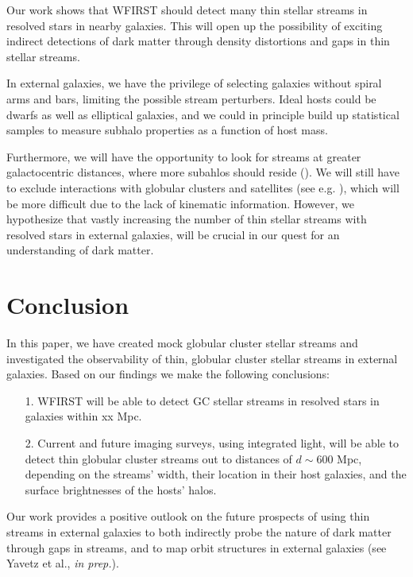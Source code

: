 \documentclass[twocolumn]{aastex62}
\begin{document}
Our work shows that WFIRST should detect many thin stellar streams in resolved stars in nearby galaxies. This will open up the possibility of exciting indirect detections of dark matter through density distortions and gaps in thin stellar streams. 

In external galaxies, we have the privilege of selecting galaxies without spiral arms and bars, limiting the possible stream perturbers. Ideal hosts could be dwarfs as well as elliptical galaxies, and we could in principle build up statistical samples to measure subhalo properties as a function of host mass. 

Furthermore, we will  have the opportunity to look for streams at greater galactocentric distances, where more subahlos should reside (\citealt{garrison17}). We will still have to exclude interactions with globular clusters and satellites (see e.g. \citealt{bonaca19}), which will be more difficult due to the lack of kinematic information. However, we hypothesize that vastly increasing the number of thin stellar streams with resolved stars in external galaxies, will be crucial in our quest for an understanding of dark matter. 

\section{Conclusion}\label{sec:conclusion}
In this paper, we have created mock globular cluster stellar streams and investigated the observability of thin, globular cluster stellar streams in external galaxies. Based on our findings we make the following conclusions:

\begin{itemize}
\item[1.]  WFIRST will be able to detect GC stellar streams in resolved stars in galaxies within xx Mpc.
\item[2.]  Current and future imaging surveys, using integrated light, will be able to detect thin globular cluster streams out to distances of $d \sim 600$ Mpc, depending on the streams' width, their location in their host galaxies, and the surface brightnesses of the hosts' halos. 
\end{itemize}


Our work provides a positive outlook on the future prospects of using thin streams in external galaxies to both indirectly probe the nature of dark matter through gaps in streams, and to map orbit structures in external galaxies (see Yavetz et al., {\it in prep.}). 
\end{document}
